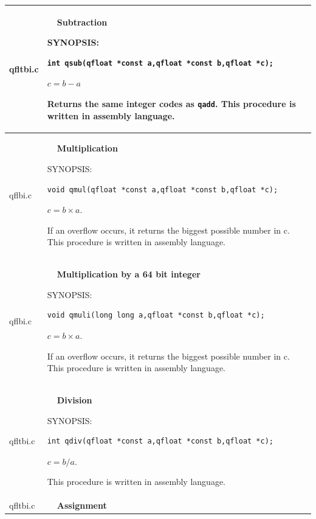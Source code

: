 \documentclass[10pt,a4paper,x11names]{memoir} %
\newcounter{entry}
\newcommand{\TOC}[1] {\addcontentsline{toc}{section}{\theentry\ \  #1} \textbf{\theentry\ \  #1} \par\stepcounter{entry}}
\begin{document}
\begin{longtable}{|p{1.5cm}|p{11.5cm}|}
	qfltbi.c& \TOC{Subtraction}
	
	{\footnotesize SYNOPSIS:}\vspace{-0.2cm}\index{qsub}
	\begin{lstlisting}[numbers=none]
		int qsub(qfloat *const a,qfloat *const b,qfloat *c);
	\end{lstlisting}\vspace{-0.2cm}
	$ c=b-a$\par
	Returns the same integer codes as \verb,qadd,. This procedure is written in assembly language.
	\\\hline
	qflbi.c& \TOC{Multiplication}
	
	{\footnotesize SYNOPSIS:}\vspace{-0.2cm}\index{qmul}
	\begin{lstlisting}[numbers=none]
		void qmul(qfloat *const a,qfloat *const b,qfloat *c); 
	\end{lstlisting}\vspace{-0.2cm}
	$c=b\times a$.\par
	If an overflow occurs, it returns the biggest possible number in c. This procedure is written in assembly language.
	
	\\\hline
	qflbi.c& \TOC{Multiplication by a 64 bit integer}
	
	{\footnotesize SYNOPSIS:}\vspace{-0.2cm}\index{qmuli}
	\begin{lstlisting}[numbers=none]
		void qmuli(long long a,qfloat *const b,qfloat *c); 
	\end{lstlisting}\vspace{-0.2cm}
	$c=b\times a$.\par
	If an overflow occurs, it returns the biggest possible number in c. This procedure is written in assembly language.
	\\\hline
	qfltbi.c& \TOC{Division}
	
	{\footnotesize SYNOPSIS:}\vspace{-0.2cm}\index{qdiv}
	\begin{lstlisting}[numbers=none]
		int qdiv(qfloat *const a,qfloat *const b,qfloat *c);
	\end{lstlisting}\vspace{-0.2cm}
	$c=b/a$.\par
	This procedure is written in assembly language.
	\\\hline
	qfltbi.c&  \TOC{Assignment}
	

\end{longtable}
\end{document}
